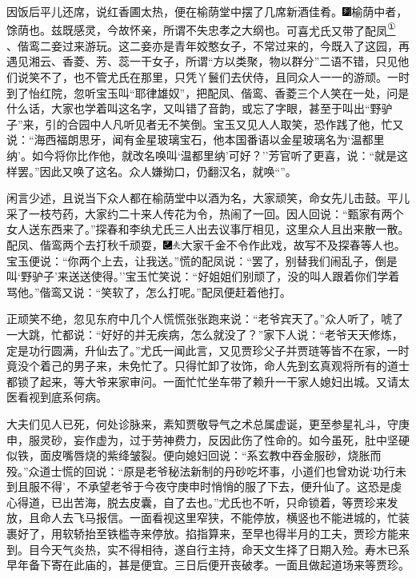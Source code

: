 因饭后平儿还席，说红香圃太热，便在榆荫堂中摆了几席新酒佳肴。{\includegraphics[width=3mm]{../Images/00007}榆荫中者，馀荫也。兹既感灵，今故怀亲，所谓不失忠孝之大纲也。}可喜尤氏又带了配凤\href{../Text/part0067_split_000.html\#lnkback_1_a}{\textsuperscript{①}}
、偕鸾二妾过来游玩。这二妾亦是青年姣憨女子，不常过来的，今既入了这园，再遇见湘云、香菱、芳、蕊一干女子，所谓``方以类聚，物以群分''二语不错，只见他们说笑不了，也不管尤氏在那里，只凭丫鬟们去伏侍，且同众人一一的游顽。一时到了怡红院，忽听宝玉叫``耶律雄奴''，把配凤、偕鸾、香菱三个人笑在一处，问是什么话，大家也学着叫这名字，又叫错了音韵，或忘了字眼，甚至于叫出``野驴子''来，引的合园中人凡听见者无不笑倒。宝玉又见人人取笑，恐作践了他，忙又说：``海西福朗思牙，闻有金星玻璃宝石，他本国番语以金星玻璃名为`温都里纳'。如今将你比作他，就改名唤叫`温都里纳'可好？''芳官听了更喜，说：``就是这样罢。''因此又唤了这名。众人嫌拗口，仍翻汉名，就唤``''。

闲言少述，且说当下众人都在榆荫堂中以酒为名，大家顽笑，命女先儿击鼓。平儿采了一枝芍药，大家约二十来人传花为令，热闹了一回。因人回说：``甄家有两个女人送东西来了。''探春和李纨尤氏三人出去议事厅相见，这里众人且出来散一散。配凤、偕鸾两个去打秋千顽耍，{\includegraphics[width=3mm]{../Images/00003}\includegraphics[width=3mm]{../Images/00012}\footnotesize \kaishu 大家千金不令作此戏，故写不及探春等人也。}宝玉便说：``你两个上去，让我送。''慌的配凤说：``罢了，别替我们闹乱子，倒是叫`野驴子'来送送使得。''宝玉忙笑说：``好姐姐们别顽了，没的叫人跟着你们学着骂他。''偕鸾又说：``笑软了，怎么打呢。''配凤便赶着他打。

正顽笑不绝，忽见东府中几个人慌慌张张跑来说：``老爷宾天了。''众人听了，唬了一大跳，忙都说：``好好的并无疾病，怎么就没了？''家下人说：``老爷天天修炼，定是功行圆满，升仙去了。''尤氏一闻此言，又见贾珍父子并贾琏等皆不在家，一时竟没个着己的男子来，未免忙了。只得忙卸了妆饰，命人先到玄真观将所有的道士都锁了起来，等大爷来家审问。一面忙忙坐车带了赖升一干家人媳妇出城。又请太医看视到底系何病。

大夫们见人已死，何处诊脉来，素知贾敬导气之术总属虚诞，更至参星礼斗，守庚申，服灵砂，妄作虚为，过于劳神费力，反因此伤了性命的。如今虽死，肚中坚硬似铁，面皮嘴唇烧的紫绛皱裂。便向媳妇回说：``系玄教中吞金服砂，烧胀而殁。''众道士慌的回说：``原是老爷秘法新制的丹砂吃坏事，小道们也曾劝说`功行未到且服不得'，不承望老爷于今夜守庚申时悄悄的服了下去，便升仙了。这恐是虔心得道，已出苦海，脱去皮囊，自了去也。''尤氏也不听，只命锁着，等贾珍来发放，且命人去飞马报信。一面看视这里窄狭，不能停放，横竖也不能进城的，忙装裹好了，用软轿抬至铁槛寺来停放。掐指算来，至早也得半月的工夫，贾珍方能来到。目今天气炎热，实不得相待，遂自行主持，命天文生择了日期入殓。寿木已系早年备下寄在此庙的，甚是便宜。三日后便开丧破孝。一面且做起道场来等贾珍。

